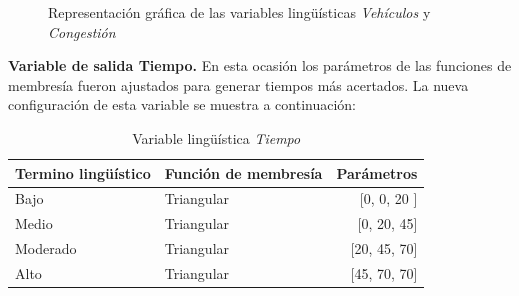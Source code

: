 \begin{figure}[H]
	\centering
	\caption[Representación gráfica de las variables lingüísticas \textit{Vehículos} y \textit{Congestión} (configuración \textit{B})]{Representación gráfica de las variables lingüísticas \textit{Vehículos} y \textit{Congestión}}
\end{figure}

\pagebreak
\textbf{Variable de salida Tiempo.}
En esta ocasión los parámetros de las funciones de membresía fueron ajustados para generar tiempos más acertados. La nueva configuración de esta variable se muestra a continuación:


\begin{table}[!h]
	\centering
	\begin{tabular}{llr} \toprule
		Termino lingüístico & Función de membresía & Parámetros \\ \midrule
		Bajo & Triangular & [0, 0, 20 ] \\
		Medio & Triangular & [0, 20, 45] \\
		Moderado & Triangular & [20, 45, 70] \\
		Alto & Triangular & [45, 70, 70] \\ \bottomrule
	\end{tabular}
	\caption[Variable lingüística \textit{Tiempo} (configuración \textit{B})]{Variable lingüística \textit{Tiempo}}
\end{table}


